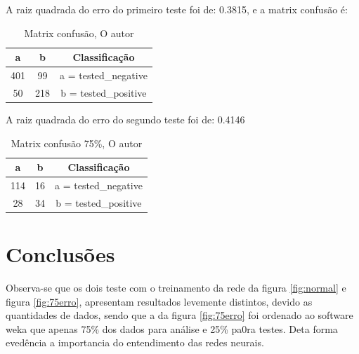 \par A raiz quadrada do erro do primeiro teste foi de: 0.3815, e a matrix confusão é:
\begin{table}
\center
  \begin{tabular}{| c | c | c |}
  \hline
    a & b & Classificação\\
    \hline
    401 & 99 &  a = tested\_negative\\
    50 & 218 &  b = tested\_positive\\
    \hline
  \end{tabular}
  \caption{Matrix confusão, O autor}
  \label{tab:normal}
\end{table}
\par A raiz quadrada do erro do segundo teste foi de: 0.4146
\begin{table}
\center
  \begin{tabular}{| c | c | c |}
  \hline
    a & b & Classificação\\
    \hline
    114 & 16 &  a = tested\_negative\\
    28 & 34 &  b = tested\_positive\\
    \hline
  \end{tabular}
\caption{Matrix confusão 75\%, O autor}
\label{tab:75}
\end{table}
\section{Conclusões}
\par Observa-se que os dois teste com o treinamento da rede da figura \ref{fig:normal} e figura \ref{fig:75erro}, apresentam resultados levemente distintos, devido as quantidades de dados, sendo que a da figura \ref{fig:75erro} foi ordenado ao software weka que apenas 75\% dos dados para análise e 25\% pa0ra testes. Deta forma evedência a importancia do entendimento das redes neurais.



